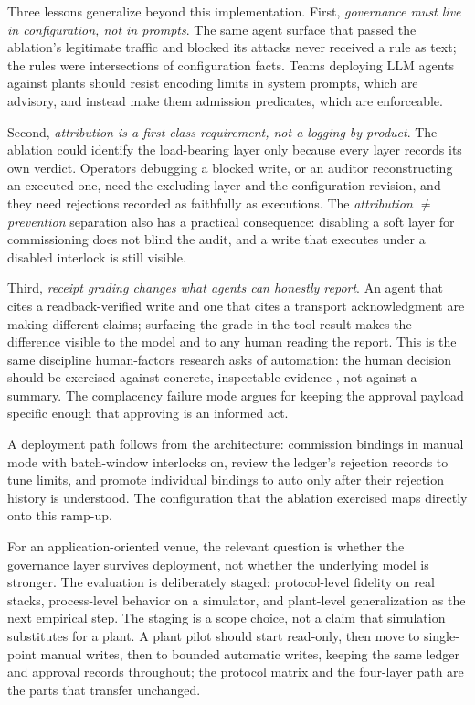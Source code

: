 Three lessons generalize beyond this implementation. First,
\emph{governance must live in configuration, not in prompts}. The same
agent surface that passed the ablation's legitimate traffic and blocked
its attacks never received a rule as text; the rules were intersections
of configuration facts. Teams deploying LLM agents against plants should
resist encoding limits in system prompts, which are advisory, and
instead make them admission predicates, which are enforceable.

Second, \emph{attribution is a first-class requirement, not a logging
by-product}. The ablation could identify the load-bearing layer only
because every layer records its own verdict. Operators debugging a
blocked write, or an auditor reconstructing an executed one, need
the excluding layer and the configuration revision, and they need
rejections recorded as faithfully as executions. The
\emph{attribution $\neq$ prevention} separation also has a practical
consequence: disabling a soft layer for commissioning does not blind the
audit, and a write that executes under a disabled interlock is still
visible.

Third, \emph{receipt grading changes what agents can honestly report}.
An agent that cites a readback-verified write and one that cites a
transport acknowledgment are making different claims; surfacing the
grade in the tool result makes the difference visible to the model and
to any human reading the report. This is the same discipline
human-factors research asks of automation: the human decision should be
exercised against concrete, inspectable evidence
\cite{parasuraman2000model}, not against a summary. The
complacency failure mode \cite{parasuramanmanzey2010complacency}
argues for keeping the approval payload specific enough that approving
is an informed act.

A deployment path follows from the architecture: commission bindings in
manual mode with batch-window interlocks on, review the ledger's
rejection records to tune limits, and promote individual bindings to
auto only after their rejection history is understood. The
configuration that the ablation exercised maps directly onto this
ramp-up.

For an application-oriented venue, the relevant question is whether the
governance layer survives deployment, not whether the underlying model is
stronger. The evaluation is deliberately staged: protocol-level fidelity
on real stacks, process-level behavior on a simulator, and plant-level
generalization as the next empirical step. The staging is a scope choice,
not a claim that simulation substitutes for a plant. A plant pilot should
start read-only, then move to single-point manual writes, then to bounded
automatic writes, keeping the same ledger and approval records throughout;
the protocol matrix and the four-layer path are the parts that transfer
unchanged.

